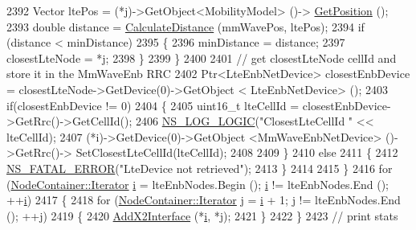 \begin{DoxyCode}
2392                         Vector ltePos = (*j)->GetObject<MobilityModel> ()->
      \hyperlink{lena-cqi-threshold_8cc_acebf763e1a0478cec225f9547941ae54}{GetPosition} ();
2393                         \textcolor{keywordtype}{double} distance = \hyperlink{namespacens3_aaae60adf695e280c4882ced6041d1628}{CalculateDistance} (mmWavePos, ltePos);
2394                         \textcolor{keywordflow}{if} (distance < minDistance)
2395                     \{
2396                                 minDistance = distance;
2397                                 closestLteNode = *j;
2398                     \}
2399                 \}
2400 
2401                 \textcolor{comment}{// get closestLteNode cellId and store it in the MmWaveEnb RRC}
2402                 Ptr<LteEnbNetDevice> closestEnbDevice = closestLteNode->GetDevice(0)->GetObject <
      LteEnbNetDevice> ();
2403                 \textcolor{keywordflow}{if}(closestEnbDevice != 0)
2404                 \{
2405                         uint16\_t lteCellId = closestEnbDevice->GetRrc()->GetCellId();
2406                         \hyperlink{group__logging_ga88acd260151caf2db9c0fc84997f45ce}{NS\_LOG\_LOGIC}(\textcolor{stringliteral}{"ClosestLteCellId "} << lteCellId);     
2407                         (*i)->GetDevice(0)->GetObject <MmWaveEnbNetDevice> ()->GetRrc()->
      SetClosestLteCellId(lteCellId);
2408 
2409                 \}
2410                 \textcolor{keywordflow}{else}
2411                 \{
2412                         \hyperlink{group__fatal_ga5131d5e3f75d7d4cbfd706ac456fdc85}{NS\_FATAL\_ERROR}(\textcolor{stringliteral}{"LteDevice not retrieved"});
2413                 \}
2414                 
2415     \}
2416     \textcolor{keywordflow}{for} (\hyperlink{classns3_1_1NodeContainer_aa1a9f2d2b09bfef7d066d3974bca2cc4}{NodeContainer::Iterator} \hyperlink{bernuolliDistribution_8m_a6f6ccfcf58b31cb6412107d9d5281426}{i} = lteEnbNodes.Begin (); 
      \hyperlink{bernuolliDistribution_8m_a6f6ccfcf58b31cb6412107d9d5281426}{i} != lteEnbNodes.End (); ++\hyperlink{bernuolliDistribution_8m_a6f6ccfcf58b31cb6412107d9d5281426}{i})
2417     \{
2418       \textcolor{keywordflow}{for} (\hyperlink{classns3_1_1NodeContainer_aa1a9f2d2b09bfef7d066d3974bca2cc4}{NodeContainer::Iterator} j = \hyperlink{bernuolliDistribution_8m_a6f6ccfcf58b31cb6412107d9d5281426}{i} + 1; j != lteEnbNodes.End (); ++j)
2419         \{
2420           \hyperlink{classns3_1_1MmWaveHelper_a879c5e60c46b04b9decd31624b91cc70}{AddX2Interface} (*\hyperlink{bernuolliDistribution_8m_a6f6ccfcf58b31cb6412107d9d5281426}{i}, *j);
2421         \}
2422     \}
2423     \textcolor{comment}{// print stats}

\end{DoxyCode}
